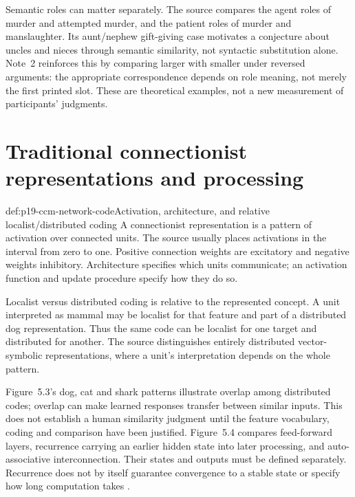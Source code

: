 Semantic roles can matter separately. The source compares the agent
roles of murder and attempted murder, and the patient roles of murder
and manslaughter. Its aunt/nephew gift-giving case motivates a conjecture
about uncles and nieces through semantic similarity, not syntactic
substitution alone. Note~2 reinforces this by comparing larger with
smaller under reversed arguments: the appropriate correspondence
depends on role meaning, not merely the first printed slot. These are
theoretical examples, not a new measurement of participants' judgments.

\section{Traditional connectionist representations and processing}
\label{sec:p19-ccm-connectionist}

\begin{hbdefinition}{def:p19-ccm-network-code}{Activation, architecture, and relative localist/distributed coding}
A connectionist representation is a pattern of activation over connected
units. The source usually places activations in the interval from zero
to one. Positive connection weights are excitatory and negative weights
inhibitory. Architecture specifies which units communicate; an activation
function and update procedure specify how they do so.

Localist versus distributed coding is relative to the represented
concept. A unit interpreted as mammal may be localist for that feature
and part of a distributed dog representation. Thus the same code can
be localist for one target and distributed for another. The source
distinguishes entirely distributed vector-symbolic representations,
where a unit's interpretation depends on the whole pattern.
\end{hbdefinition}

Figure~5.3's dog, cat and shark patterns illustrate overlap among
distributed codes; overlap can make learned responses transfer between
similar inputs. This does not establish a human similarity judgment
until the feature vocabulary, coding and comparison have been justified.
Figure~5.4 compares feed-forward layers, recurrence carrying an earlier
hidden state into later processing, and auto-associative interconnection.
Their states and outputs must be defined separately. Recurrence does
not by itself guarantee convergence to a stable state or specify how
long computation takes \parencite[pp.~56--57]{DoumasHummel2012HigherCognition}.


